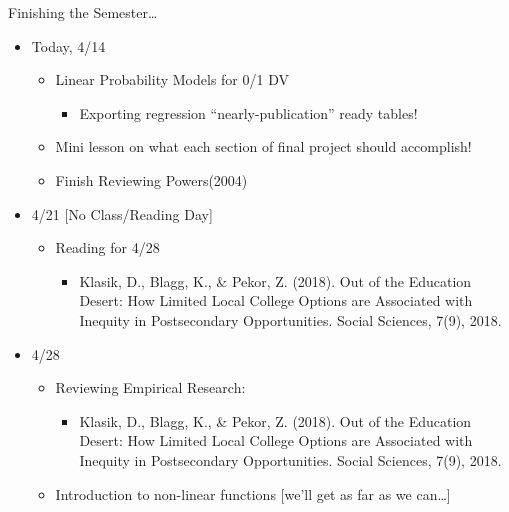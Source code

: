 \documentclass[
  8pt,
  ignorenonframetext,
  dvipsnames]{beamer}
\providecommand{\tightlist}{%
  \setlength{\itemsep}{0pt}\setlength{\parskip}{0pt}}
\let\olditem\item
\renewcommand{\item}{%
  \olditem\vspace{4pt}
}
\begin{document}
\begin{frame}{Finishing the Semester\ldots{}}
\protect\hypertarget{finishing-the-semester}{}

\begin{itemize}
\tightlist
\item
  Today, 4/14

  \begin{itemize}
  \tightlist
  \item
    Linear Probability Models for 0/1 DV

    \begin{itemize}
    \tightlist
    \item
      Exporting regression ``nearly-publication'' ready tables!
    \end{itemize}
  \item
    Mini lesson on what each section of final project should accomplish!
  \item
    Finish Reviewing Powers(2004)
  \end{itemize}
\end{itemize}

\medskip

\begin{itemize}
\tightlist
\item
  4/21 {[}No Class/Reading Day{]}

  \begin{itemize}
  \tightlist
  \item
    Reading for 4/28

    \begin{itemize}
    \tightlist
    \item
      Klasik, D., Blagg, K., \& Pekor, Z. (2018). Out of the Education
      Desert: How Limited Local College Options are Associated with
      Inequity in Postsecondary Opportunities. Social Sciences, 7(9),
      2018.
    \end{itemize}
  \end{itemize}
\end{itemize}

\medskip

\begin{itemize}
\tightlist
\item
  4/28

  \begin{itemize}
  \tightlist
  \item
    Reviewing Empirical Research:

    \begin{itemize}
    \tightlist
    \item
      Klasik, D., Blagg, K., \& Pekor, Z. (2018). Out of the Education
      Desert: How Limited Local College Options are Associated with
      Inequity in Postsecondary Opportunities. Social Sciences, 7(9),
      2018.\\
    \end{itemize}
  \item
    Introduction to non-linear functions {[}we'll get as far as we
    can\ldots{]}
  \end{itemize}
\end{itemize}


\end{frame}
\end{document}
